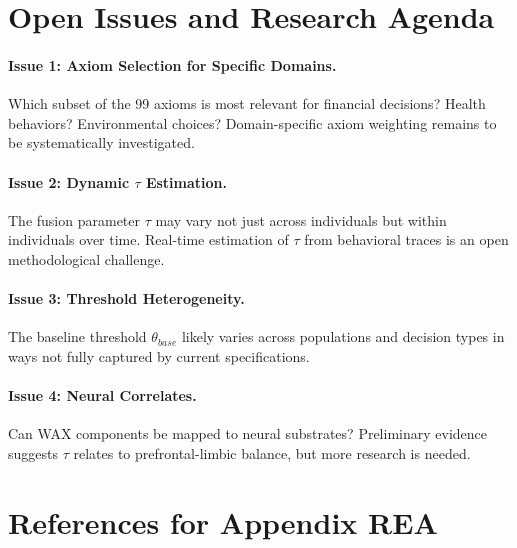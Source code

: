 
\section{Open Issues and Research Agenda}
\label{sec:av-openissues}

\paragraph{Issue 1: Axiom Selection for Specific Domains.}
Which subset of the 99 axioms is most relevant for financial decisions?
Health behaviors? Environmental choices? Domain-specific axiom weighting
remains to be systematically investigated.

\paragraph{Issue 2: Dynamic $\tau$ Estimation.}
The fusion parameter $\tau$ may vary not just across individuals but
within individuals over time. Real-time estimation of $\tau$ from
behavioral traces is an open methodological challenge.

\paragraph{Issue 3: Threshold Heterogeneity.}
The baseline threshold $\theta_{base}$ likely varies across populations
and decision types in ways not fully captured by current specifications.

\paragraph{Issue 4: Neural Correlates.}
Can WAX components be mapped to neural substrates? Preliminary evidence
suggests $\tau$ relates to prefrontal-limbic balance, but more research
is needed.


\section{References for Appendix REA}
\label{sec:av-references}


